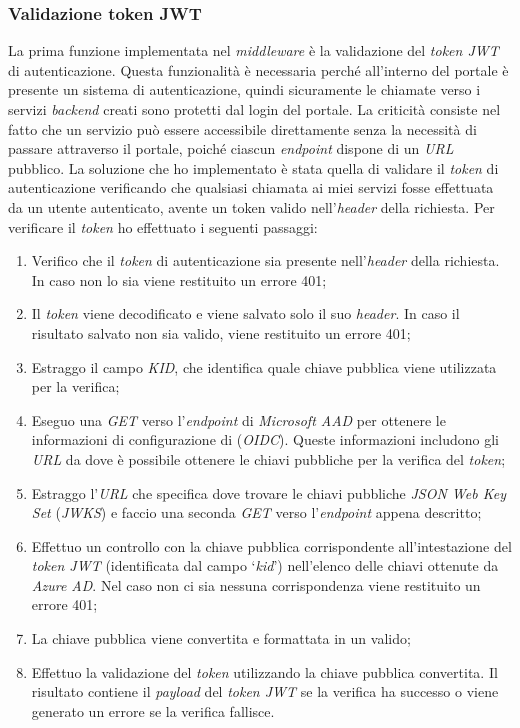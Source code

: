 \subsubsection{Validazione token JWT}\label{subsubsec:validazione-token-jwt}
La prima funzione implementata nel \textit{middleware} è la validazione del \textit{token JWT} di autenticazione. Questa funzionalità è necessaria perché all'interno del portale è presente un sistema di autenticazione, quindi sicuramente le chiamate verso i servizi \textit{backend} creati sono protetti dal login del portale.
La criticità consiste nel fatto che un servizio può essere accessibile direttamente senza la necessità di passare attraverso il portale, poiché ciascun \textit{endpoint} dispone di un \textit{URL} pubblico.
La soluzione che ho implementato è stata quella di validare il \textit{token} di autenticazione verificando che qualsiasi chiamata ai miei servizi fosse effettuata da un utente autenticato, avente un token valido nell'\textit{header} della richiesta.
Per verificare il \textit{token} ho effettuato i seguenti passaggi:
\begin{enumerate}
  \item Verifico che il \textit{token} di autenticazione sia presente nell'\textit{header} della richiesta. In caso non lo sia viene restituito un errore 401;
  \item Il \textit{token} viene decodificato e viene salvato solo il suo \textit{header}. In caso il risultato salvato non sia valido, viene restituito un errore 401;
  \item Estraggo il campo \textit{KID}, che identifica quale chiave pubblica viene utilizzata per la verifica;
  \item Eseguo una \textit{GET} verso l'\textit{endpoint} di \textit{Microsoft AAD} per ottenere le informazioni di configurazione di  (\textit{OIDC}). 
  Queste informazioni includono gli \textit{URL} da dove è possibile ottenere le chiavi pubbliche per la verifica del \textit{token};
  \item Estraggo l'\textit{URL} che specifica dove trovare le chiavi pubbliche \textit{JSON Web Key Set} (\textit{JWKS}) e faccio una seconda \textit{GET} verso l'\textit{endpoint} appena descritto;
  \item Effettuo un controllo con la chiave pubblica corrispondente all'intestazione del \textit{token JWT} (identificata dal campo `\textit{kid}') nell'elenco delle chiavi ottenute da \textit{Azure AD}. Nel caso non ci sia nessuna corrispondenza viene restituito un errore 401;
  \item La chiave pubblica viene convertita e formattata in un  valido;
  \item Effettuo la validazione del \textit{token} utilizzando la chiave pubblica convertita. Il risultato contiene il \textit{payload} del \textit{token JWT} se la verifica ha successo o viene generato un errore se la verifica fallisce.
\end{enumerate}

